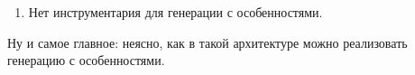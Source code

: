 \documentclass[../diploma.tex]{subfiles}
\begin{document}
\begin{enumerate}[resume]
    \item Нет инструментария для генерации с особенностями.
\end{enumerate}
Ну и самое главное: неясно, как в такой архитектуре можно реализовать генерацию с особенностями. 



\end{document}
